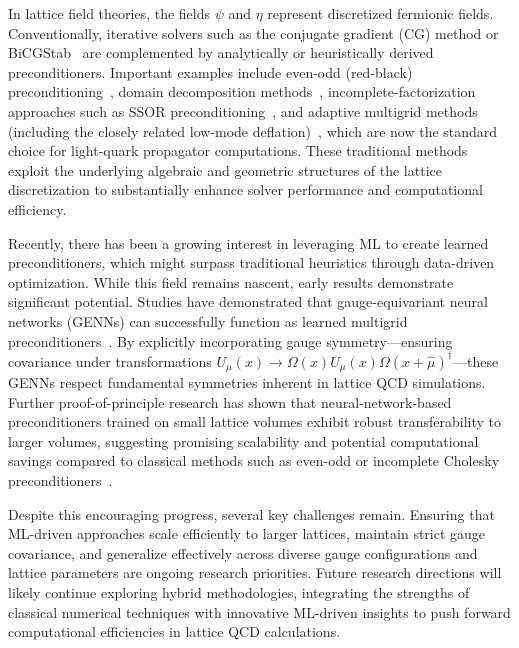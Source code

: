 \documentclass[12pt]{article}
\begin{document}
In lattice field theories, the fields $\psi$ and $\eta$ represent discretized fermionic fields. Conventionally, iterative solvers such as the conjugate gradient (CG) method or BiCGStab~\cite{Frommer:1994vn} are complemented by analytically or heuristically derived preconditioners. Important examples include even-odd (red-black) preconditioning~\cite{DeGrand:1990dk}, domain decomposition methods~\cite{Luscher:2003qa}, incomplete-factorization approaches such as SSOR preconditioning~\cite{Fischer:1996th}, and adaptive multigrid methods (including the closely related low-mode deflation)~\cite{Brannick:2007ue,Luscher:2007se,Babich:2010qb,Frommer:2013fsa,Clark:2016rdz}, which are now the standard choice for light-quark propagator computations. These traditional methods exploit the underlying algebraic and geometric structures of the lattice discretization to substantially enhance solver performance and computational efficiency.

Recently, there has been a growing interest in leveraging ML to create learned preconditioners, which might surpass traditional heuristics through data-driven optimization. While this field remains nascent, early results demonstrate significant potential. Studies have demonstrated that gauge-equivariant neural networks (GENNs) can successfully function as learned multigrid preconditioners~\cite{Lehner:2023prf,Lehner:2023bba,Pfahler:2026fpj}. By explicitly incorporating gauge symmetry---ensuring covariance under transformations $U_\mu(x) \rightarrow \Omega(x) U_\mu(x) \Omega(x+\hat{\mu})^\dagger$---these GENNs respect fundamental symmetries inherent in lattice QCD simulations. Further proof-of-principle research has shown that neural-network-based preconditioners trained on small lattice volumes exhibit robust transferability to larger volumes, suggesting promising scalability and potential computational savings compared to classical methods such as even-odd or incomplete Cholesky preconditioners~\cite{Cali:2022qbd, Sun:2025evk}.

Despite this encouraging progress, several key challenges remain. Ensuring that ML-driven approaches scale efficiently to larger lattices, maintain strict gauge covariance, and generalize effectively across diverse gauge configurations and lattice parameters are ongoing research priorities. Future research directions will likely continue exploring hybrid methodologies, integrating the strengths of classical numerical techniques with innovative ML-driven insights to push forward computational efficiencies in lattice QCD calculations.
\end{document}
